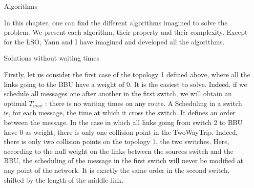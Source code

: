 \documentclass[a4paper,10pt]{report}
\begin{document}
\begin{chapter}{Algorithms}

In this chapter, one can find the different algorithms imagined to solve the problem. We present each algorithm, their property and their complexity.
Except for the LSO, Yann and I have imagined and developed all the algorithms.

\begin{section}{Solutions without waiting times}

Firstly, let us consider the first case of the topology 1 defined above, where all the links going to the BBU
have a weight of 0. It is the easiest to solve. 
Indeed, if we schedule all messages one after another in the first switch, we will obtain an optimal
$T_{max}$ : there is no waiting times on any route.
A Scheduling in a switch is, for each message, the time at which it cross the switch. It defines an order between the message.
In the case in which all links going from switch 2 to BBU have 0 as weight, there is only one collision point in the TwoWayTrip.
Indeed, there is only two collision points on the topology 1, the two switches. Here, according to the null weight on the links between the sources switch and the BBU, the scheduling of the message in the first switch will never be modified at any point of the network. It is exactly the same order in the second switch, shifted by the length of the middle link.\\


\end{section}
\end{chapter}
\end{document}
